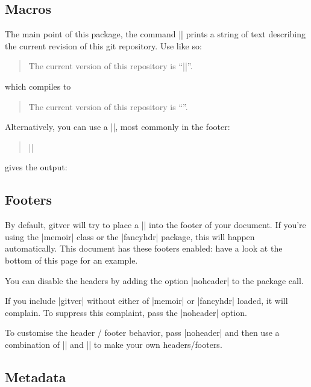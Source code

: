 \documentclass[a4paper]{ltxdoc}
\begin{document}
\subsection{Macros} %
\label{sub:macros}


\DescribeMacro{\gitVer}
%
The main point of this package, the command |\gitVer| prints a string of text
describing the current revision of this git repository. Use like so:
\begin{quote}
	The current version of this repository is ``|\gitVer{}|''.
\end{quote}
which compiles to
\begin{quote}
	The current version of this repository is ``\gitVer{}''.
\end{quote}

\DescribeMacro{\versionBox}
Alternatively, you can use a |\versionBox|, most commonly in the footer:
\begin{quote}
	|\versionBox{}|
\end{quote}
%
gives the output:
\vspace{3mm}

\versionBox{}

\subsection{Footers} %
\label{sub:footers}

By default, \textsf{gitver} will try to place a |\versionBox| into the footer of
your document. If you're using the |memoir| class or the |fancyhdr| package,
this will happen automatically. This document has these footers enabled: have a
look at the bottom of this page for an example. 

You can disable the headers by adding the option |noheader| to the package call. 

If you include |gitver| without either of |memoir| or |fancyhdr| loaded, it will
complain. To suppress this complaint, pass the |noheader| option. 

To customise the header / footer behavior, pass |noheader| and then use a
combination of |\versionBox| and |\gitVer| to make your own headers/footers. 


\subsection{Metadata} %
\label{sub:metadata}
\end{document}
